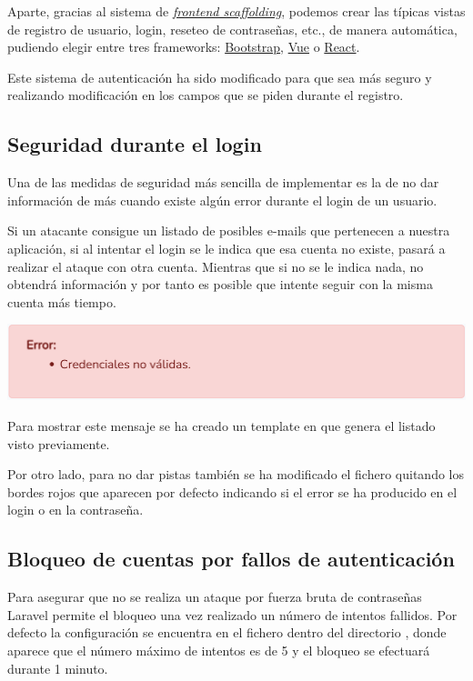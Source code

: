 \documentclass{\ClassPath/viu-tfm-template}
\begin{document}
Aparte, gracias al sistema de \textit{\href{https://laravel.com/docs/6.x/frontend}{frontend scaffolding}}, podemos crear las típicas vistas de registro de usuario, login, reseteo de contraseñas, etc., de manera automática, pudiendo elegir entre tres frameworks: \href{https://getbootstrap.com/}{Bootstrap}, \href{https://vuejs.org/}{Vue} o \href{https://es.reactjs.org/}{React}.

Este sistema de autenticación ha sido modificado para que sea más seguro y realizando modificación en los campos que se piden durante el registro.


\subsection{Seguridad durante el login}
Una de las medidas de seguridad más sencilla de implementar es la de no dar información de más cuando existe algún error durante el login de un usuario.

Si un atacante consigue un listado de posibles e-mails que pertenecen a nuestra aplicación, si al intentar el login se le indica que esa cuenta no existe, pasará a realizar el ataque con otra cuenta. Mientras que si no se le indica nada, no obtendrá información y por tanto es posible que intente seguir con la misma cuenta más tiempo.

\begin{center}
    \includegraphics[width=0.8\linewidth]{img/error_simple.png}
\end{center}

Para mostrar este mensaje se ha creado un template en  que genera el listado visto previamente.

Por otro lado, para no dar pistas también se ha modificado el fichero  quitando los bordes rojos que aparecen por defecto indicando si el error se ha producido en el login o en la contraseña.


\subsection{Bloqueo de cuentas por fallos de autenticación}
Para asegurar que no se realiza un ataque por fuerza bruta  de contraseñas  Laravel permite el bloqueo una vez realizado un número de intentos fallidos. Por defecto la configuración se encuentra en el fichero  dentro del directorio , donde aparece que el número máximo de intentos es de 5 y el bloqueo se efectuará durante 1 minuto.
\end{document}

